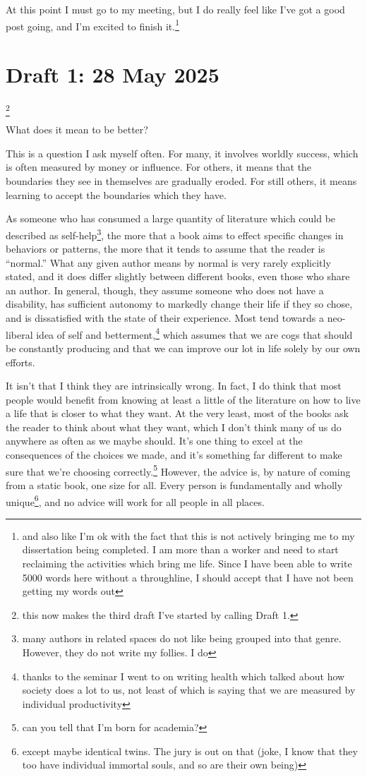 \documentclass[12pt]{article}
\newcommand{\say}[1]{``#1''}
\renewcommand{\,}{\textsuperscript{,}}
\begin{document}
At this point I must go to my meeting, but I do really feel like I've got a good post going, and I'm excited to finish it.\footnote{and also like I'm ok with the fact that this is not actively bringing me to my dissertation being completed. I am more than a worker and need to start reclaiming the activities which bring me life. Since I have been able to write 5000 words here without a throughline, I should accept that I have not been getting my words out}

\section{Draft 1: 28 May 2025}\footnote{this now makes the third draft I've started by calling Draft 1.}

What does it mean to be better?

This is a question I ask myself often.  
For many, it involves worldly success, which is often measured by money or influence.  
For others, it means that the boundaries they see in themselves are gradually eroded.  
For still others, it means learning to accept the boundaries which they have.

As someone who has consumed a large quantity of literature which could be described as self-help\footnote{many authors in related spaces do not like being grouped into that genre. However, they do not write my follies. I do}, the more that a book aims to effect specific changes in behaviors or patterns, the more that it tends to assume that the reader is \say{normal.}  
What any given author means by normal is very rarely explicitly stated, and it does differ slightly between different books, even those who share an author.  
In general, though, they assume someone who does not have a disability, has sufficient autonomy to markedly change their life if they so chose, and is dissatisfied with the state of their experience.  
Most tend towards a neo-liberal idea of self and betterment,\footnote{thanks to the seminar I went to on writing health which talked about how society does a lot to us, not least of which is saying that we are measured by individual productivity} which assumes that we are cogs that should be constantly producing and that we can improve our lot in life solely by our own efforts.

It isn't that I think they are intrinsically wrong.  
In fact, I do think that most people would benefit from knowing at least a little of the literature on how to live a life that is closer to what they want.  
At the very least, most of the books ask the reader to think about what they want, which I don't think many of us do anywhere as often as we maybe should.  
It's one thing to excel at the consequences of the choices we made, and it's something far different to make sure that we're choosing correctly.\footnote{can you tell that I'm born for academia?}  
However, the advice is, by nature of coming from a static book, one size for all.  
Every person is fundamentally and wholly unique\footnote{except maybe identical twins. The jury is out on that (joke, I know that they too have individual immortal souls, and so are their own being)}, and no advice will work for all people in all places.
\end{document}
